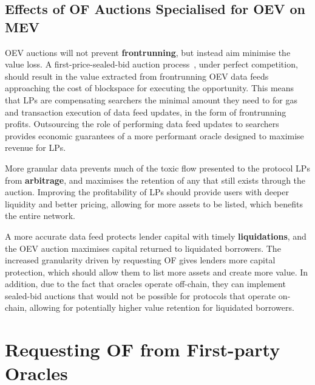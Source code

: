 \documentclass[11pt]{article}
\begin{document}
\subsection{Effects of OF Auctions Specialised for OEV on MEV}

OEV auctions will not prevent \textbf{frontrunning}, but instead aim minimise the value loss.
A first-price-sealed-bid auction process~\cite{fpsba}, under perfect competition, should result in the value extracted from frontrunning OEV data feeds approaching the cost of blockspace for executing the opportunity.
This means that LPs are compensating searchers the minimal amount they need to for gas and transaction execution of data feed updates, in the form of frontrunning profits.
Outsourcing the role of performing data feed updates to searchers provides economic guarantees of a more performant oracle designed to maximise revenue for LPs.

More granular data prevents much of the toxic flow presented to the protocol LPs from \textbf{arbitrage}, and maximises the retention of any that still exists through the auction.
Improving the profitability of LPs should provide users with deeper liquidity and better pricing, allowing for more assets to be listed, which benefits the entire network.

A more accurate data feed protects lender capital with timely \textbf{liquidations}, and the OEV auction maximises capital returned to liquidated borrowers.
The increased granularity driven by requesting OF gives lenders more capital protection, which should allow them to list more assets and create more value.
In addition, due to the fact that oracles operate off-chain, they can implement sealed-bid auctions that would not be possible for protocols that operate on-chain, allowing for potentially higher value retention for liquidated borrowers. 

\section{Requesting OF from First-party Oracles}
\end{document}
